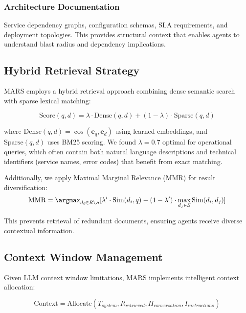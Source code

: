 \documentclass[journal]{IEEEtran}
\begin{document}
\subsubsection{Architecture Documentation}
Service dependency graphs, configuration schemas, SLA requirements, and deployment topologies. This provides structural context that enables agents to understand blast radius and dependency implications.

\subsection{Hybrid Retrieval Strategy}

MARS employs a hybrid retrieval approach combining dense semantic search with sparse lexical matching:

\begin{equation}
\text{Score}(q, d) = \lambda \cdot \text{Dense}(q, d) + (1-\lambda) \cdot \text{Sparse}(q, d)
\end{equation}

where $\text{Dense}(q, d) = \cos(\mathbf{e}_q, \mathbf{e}_d)$ using learned embeddings, and $\text{Sparse}(q, d)$ uses BM25 scoring. We found $\lambda = 0.7$ optimal for operational queries, which often contain both natural language descriptions and technical identifiers (service names, error codes) that benefit from exact matching.

Additionally, we apply Maximal Marginal Relevance (MMR) \cite{carbonell1998use} for result diversification:
\begin{equation}
\text{MMR} = \argmax_{d_i \in R \setminus S} [\lambda' \cdot \text{Sim}(d_i, q) - (1-\lambda') \cdot \max_{d_j \in S} \text{Sim}(d_i, d_j)]
\end{equation}

This prevents retrieval of redundant documents, ensuring agents receive diverse contextual information.

\subsection{Context Window Management}

Given LLM context window limitations, MARS implements intelligent context allocation:

\begin{equation}
\text{Context} = \text{Allocate}(T_{system}, R_{retrieved}, H_{conversation}, I_{instructions})
\end{equation}
\end{document}
